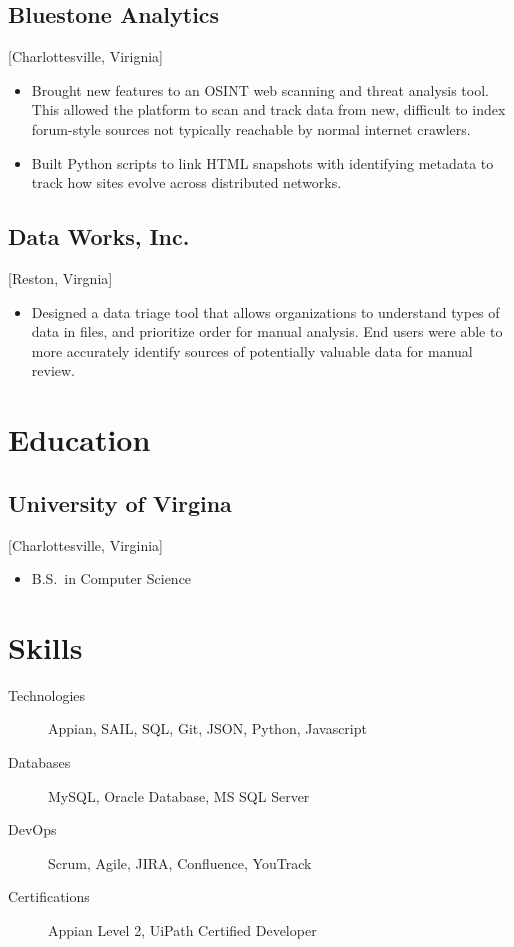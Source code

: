 \documentclass{mycv}
\begin{document}
\subsection{Bluestone Analytics}[Charlottesville, Virignia]
\begin{positions}
\end{positions}
\begin{itemize}
  \item Brought new features to an OSINT web scanning and threat analysis tool. This allowed the platform to scan and track data from new, difficult to index forum-style sources not typically reachable by normal internet crawlers.
  \item Built Python scripts to link HTML snapshots with identifying metadata to track how sites evolve across distributed networks.
\end{itemize}

\subsection{Data Works, Inc.}[Reston, Virgnia]
\begin{positions}
\end{positions}
\begin{itemize}
  \item Designed a data triage tool that allows organizations to understand types of data in files, and prioritize order for manual analysis. End users were able to more accurately identify sources of potentially valuable data for manual review.
\end{itemize}

\section{Education}

\subsection{University of Virgina}[Charlottesville, Virginia]
\vspace{-\parskip}%
\begin{itemize}[label={}]
  \item B.S.\ in Computer Science 
\end{itemize}

\section{Skills}
\begin{description}
  \item[Technologies] Appian, SAIL, SQL, Git, JSON, Python, Javascript
  \item[Databases] MySQL, Oracle Database, MS SQL Server
  \item[DevOps] Scrum, Agile, JIRA, Confluence, YouTrack
  \item[Certifications] Appian Level 2, UiPath Certified Developer
\end{description}
\end{document}
